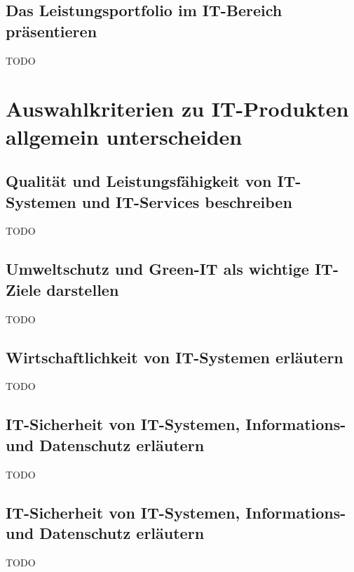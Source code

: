 \documentclass[11pt]{article}
\begin{document}
\subsection{Das Leistungsportfolio im IT-Bereich präsentieren}
    TODO

\section{Auswahlkriterien zu IT-Produkten allgemein unterscheiden}
\subsection{Qualität und Leistungsfähigkeit von IT-Systemen und IT-Services beschreiben}
    TODO

\subsection{Umweltschutz und Green-IT als wichtige IT-Ziele darstellen}
    TODO
\subsection{Wirtschaftlichkeit von IT-Systemen erläutern}
    TODO
\subsection{IT-Sicherheit von IT-Systemen, Informations- und Datenschutz erläutern}
    TODO
\subsection{IT-Sicherheit von IT-Systemen, Informations- und Datenschutz erläutern}
    TODO
\end{document}
